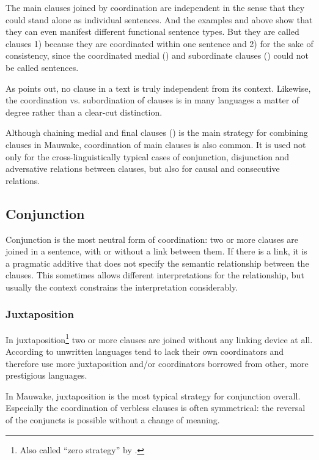 The main clauses joined by coordination are independent in the sense that they could stand alone as individual sentences. And the examples  and  above show that they can even manifest different functional sentence types. But they are called clauses 1) because they are coordinated within one sentence and 2) for the sake of consistency, since the coordinated medial () and subordinate clauses () could not be called sentences.

As \citet[848]{Givon1990} points out, no clause in a text is truly independent from its context. Likewise, the coordination vs. subordination of clauses is in many languages a matter of degree rather than a clear-cut distinction. 

Although chaining medial and final clauses () is the main strategy for combining clauses in Mauwake, coordination of main clauses is also common. It is used not only for the cross-linguistically typical cases of conjunction, disjunction and adversative relations between clauses, but also for causal and consecutive relations.  

\subsection{Conjunction} \label{sec:8.1.1}

Conjunction is the most neutral form of coordination: two or more clauses are joined in a sentence, with or without a link between them. If there is a link, it is a pragmatic additive that does not specify the semantic relationship between the clauses. This sometimes allows different interpretations for the relationship, but usually the context constrains the interpretation considerably. 

\subsubsection{Juxtaposition}

In juxtaposition\footnote{Also called ``zero strategy'' by \citet[25]{Payne1985}.} two or more clauses are joined without any linking device at all. According to \citet[8]{Haspelmath2007} unwritten languages tend to lack their own coordinators and therefore use more juxtaposition and/or coordinators borrowed  from other, more prestigious languages. 

In Mauwake, juxtaposition is the most typical strategy for conjunction overall. Especially the coordination of verbless clauses is often symmetrical: the reversal of the conjuncts is possible without a change of meaning. 

